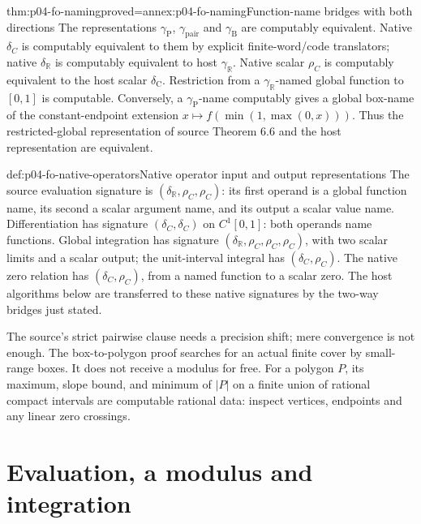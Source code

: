 \begin{hbtheorem}{thm:p04-fo-naming}{proved=annex:p04-fo-naming}{Function-name bridges with both directions}
The representations \(\gamma_{\mathrm P}\),
\(\gamma_{\mathrm{pair}}\) and \(\gamma_{\mathrm B}\) are
computably equivalent. Native \(\delta_C\) is computably
equivalent to them by explicit finite-word/code translators;
native \(\delta_{\mathbb R}\) is computably equivalent to
host \(\gamma_{\mathbb R}\).
Native scalar \(\rho_C\) is computably equivalent to the
host scalar \(\delta_{\mathrm C}\).
Restriction from a
\(\gamma_{\mathbb R}\)-named global function to \([0,1]\)
is computable. Conversely, a \(\gamma_{\mathrm P}\)-name
computably gives a global box-name of the constant-endpoint
extension \(x\mapsto f(\min(1,\max(0,x)))\).
Thus the restricted-global representation of source
Theorem 6.6 and the host representation are equivalent.
\end{hbtheorem}

\begin{hbconvention}{def:p04-fo-native-operators}{Native operator input and output representations}
The source evaluation signature is
\((\delta_{\mathbb R},\rho_C,\rho_C)\):
its first operand is a global function name, its second
a scalar argument name, and its output a scalar value name.
Differentiation has signature \((\delta_C,\delta_C)\)
on \(C^1[0,1]\): both operands name functions.
Global integration has signature
\((\delta_{\mathbb R},\rho_C,\rho_C,\rho_C)\),
with two scalar limits and a scalar output;
the unit-interval integral has \((\delta_C,\rho_C)\).
The native zero relation has \((\delta_C,\rho_C)\),
from a named function to a scalar zero.
The host algorithms below are transferred to these native
signatures by the two-way bridges just stated.
\end{hbconvention}

The source's strict pairwise clause needs a precision shift;
mere convergence is not enough. The box-to-polygon proof
searches for an actual finite cover by small-range boxes.
It does not receive a modulus for free.
For a polygon \(P\), its maximum, slope bound, and minimum
of \(\lvert P\rvert\) on a finite union of rational compact
intervals are computable rational data: inspect vertices,
endpoints and any linear zero crossings.

\section{Evaluation, a modulus and integration}
\label{sec:p04-fo-integration}

